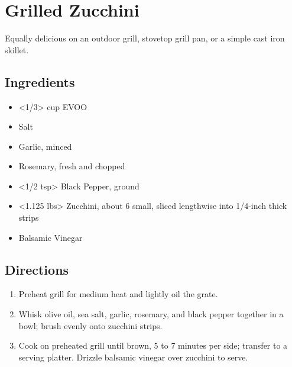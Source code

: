 \section{Grilled Zucchini}

Equally delicious on an outdoor grill, stovetop grill pan, or a simple cast iron skillet. 

\subsection{ Ingredients }

\begin{itemize}
  \item <1/3> cup EVOO
  \item <1 tsp> Salt
  \item <2 cloves> Garlic, minced
  \item <1 tbs> Rosemary, fresh and chopped
  \item <1/2 tsp> Black Pepper, ground
  \item <1.125 lbs> Zucchini, about 6 small, sliced lengthwise into 1/4-inch thick strips
  \item <3 tbs> Balsamic Vinegar
\end{itemize}

\subsection{ Directions }

\begin{enumerate}
  \item Preheat grill for medium heat and lightly oil the grate.

  \item Whisk olive oil, sea salt, garlic, rosemary, and black pepper together in a bowl; brush evenly onto zucchini strips.

  \item Cook on preheated grill until brown, 5 to 7 minutes per side; transfer to a serving platter. Drizzle balsamic vinegar over zucchini to serve.
\end{enumerate}
